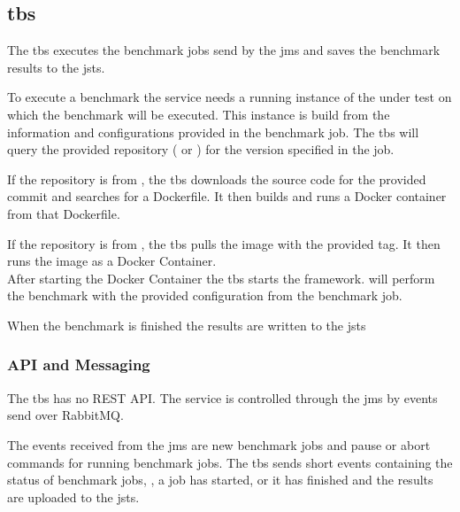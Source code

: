 \subsection{\acl{tbs}}
\label{sec:ts_benchmarking_service}
The \ac{tbs} executes the benchmark jobs send by the \ac{jms} and saves the benchmark results to the \acl*{jsts}.

To execute a benchmark the service needs a running instance of the \ts{} under test on which the benchmark will be executed.
This instance is build from the information and configurations provided in the benchmark job.
The \ac{tbs} will query the provided repository (\gh{} or \dockh{}) for the version specified in the job.

If the repository is from \gh{}, the \ac{tbs} downloads the source code for the provided commit and searches for a Dockerfile.
It then builds and runs a Docker container from that Dockerfile.

If the repository is from \dockh{}, the \ac{tbs} pulls the image with the provided tag.
It then runs the image as a Docker Container.
\\

After starting the Docker Container the \ac{tbs} starts the \iguana{} framework.
\iguana{} will perform the benchmark with the provided configuration from the benchmark job.

When the benchmark is finished the results are written to the \acl*{jsts}

\subsubsection{API and Messaging}
\label{sec:benchmarking_api}
The \ac{tbs} has no REST API.
The service is controlled through the \ac{jms} by events send over RabbitMQ.

The events received from the \ac{jms} are new benchmark jobs and pause or abort commands for running benchmark jobs.
The \ac{tbs} sends short events containing the status of benchmark jobs, \eg, a job has started, or it has finished and the results are uploaded to the \acl{jsts}.